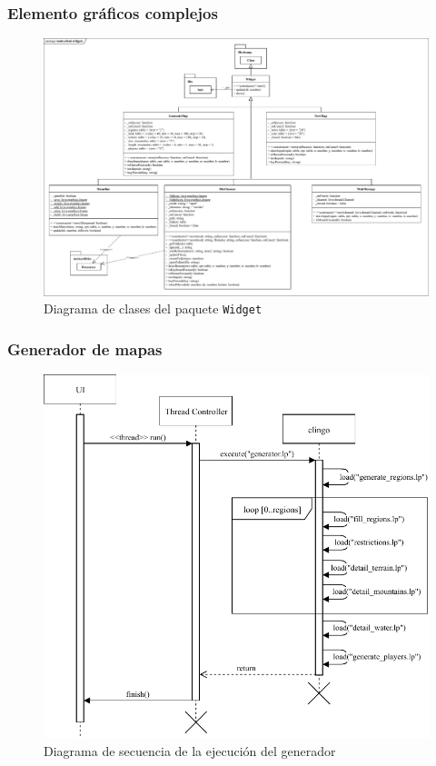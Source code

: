\subsubsection{Elemento gráficos complejos}
\label{subsubsec:widgets}

\begin{figure}
	\centering
	\includegraphics[width=\textwidth]{images/clases-widgets.pdf}
	\caption{Diagrama de clases del paquete \texttt{Widget}}
	\label{fig:widgetclasses}
\end{figure}

\subsubsection{Generador de mapas}
\label{subsubsec:generator}

\begin{figure}
	\centering
	\includegraphics[width=\textwidth]{images/secuencia.pdf}
	\caption{Diagrama de secuencia de la ejecución del generador}
	\label{fig:sequence}
\end{figure}